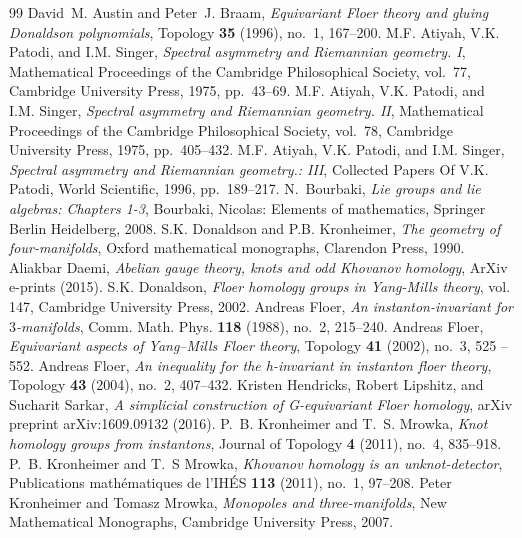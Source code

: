 \documentclass[10pt,a4paper]{amsart}
\theoremstyle{definition}
\theoremstyle{remark}
\numberwithin{figure}{qchap}
\begin{document}
\begin{thebibliography}{99}
 David~M. Austin and Peter~J. Braam, \emph{Equivariant {Floer} theory and gluing {Donaldson} polynomials}, Topology \textbf{35} (1996), no.~1, 167--200.
 M.F. Atiyah, V.K. Patodi, and I.M. Singer, \emph{Spectral asymmetry and {Riemannian} geometry. {I}}, Mathematical Proceedings of the Cambridge Philosophical Society, vol.~77, Cambridge University Press, 1975, pp.~43--69.
 M.F. Atiyah, V.K. Patodi, and I.M. Singer, \emph{Spectral asymmetry and {Riemannian} geometry. {II}}, Mathematical Proceedings of the Cambridge Philosophical Society, vol.~78, Cambridge University Press, 1975, pp.~405--432.
 M.F. Atiyah, V.K. Patodi, and I.M. Singer, \emph{Spectral asymmetry and {Riemannian} geometry.: {III}}, Collected Papers Of V.K. Patodi, World Scientific, 1996, pp.~189--217.
 N.~Bourbaki, \emph{Lie groups and lie algebras: Chapters 1-3}, Bourbaki, Nicolas: Elements of mathematics, Springer Berlin Heidelberg, 2008.
 S.K. Donaldson and P.B. Kronheimer, \emph{The geometry of four-manifolds}, Oxford mathematical monographs, Clarendon Press, 1990.
 Aliakbar {Daemi}, \emph{Abelian gauge theory, knots and odd {Khovanov} homology}, ArXiv e-prints (2015).
 S.K. Donaldson, \emph{Floer homology groups in {Yang-Mills} theory}, vol. 147, Cambridge University Press, 2002.
 Andreas Floer, \emph{An instanton-invariant for $3$-manifolds}, Comm. Math. Phys. \textbf{118} (1988), no.~2, 215--240.
 Andreas Floer, \emph{Equivariant aspects of {Yang–Mills} {Floer} theory}, Topology \textbf{41} (2002), no.~3, 525 -- 552.
 Andreas Floer, \emph{An inequality for the h-invariant in instanton floer theory}, Topology \textbf{43} (2004), no.~2, 407--432.
 Kristen Hendricks, Robert Lipshitz, and Sucharit Sarkar, \emph{A simplicial construction of {G}-equivariant {Floer} homology}, arXiv preprint arXiv:1609.09132 (2016).
 P.~B. Kronheimer and T.~S. Mrowka, \emph{Knot homology groups from instantons}, Journal of Topology \textbf{4} (2011), no.~4, 835--918.
 P.~B. Kronheimer and T.~S Mrowka, \emph{Khovanov homology is an unknot-detector}, Publications math{\'e}matiques de l'IH{\'E}S \textbf{113} (2011), no.~1, 97--208.
 Peter Kronheimer and Tomasz Mrowka, \emph{Monopoles and three-manifolds}, New Mathematical Monographs, Cambridge University Press, 2007.

\end{thebibliography}
\end{document}
